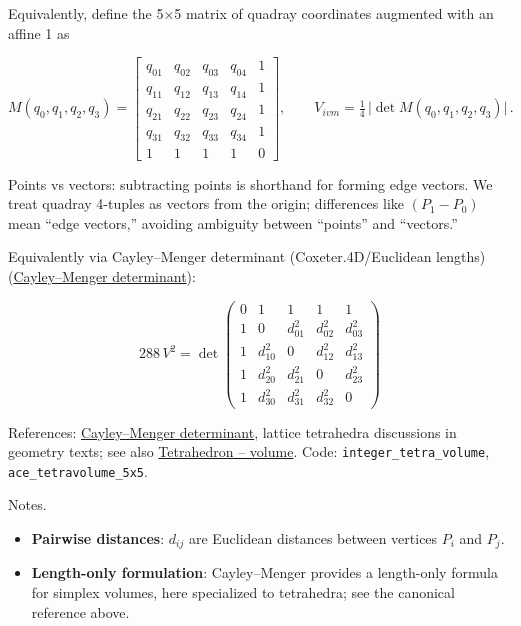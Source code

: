 \documentclass[
]{article}
\providecommand{\tightlist}{%
  \setlength{\itemsep}{0pt}\setlength{\parskip}{0pt}}
\begin{document}
Equivalently, define the 5×5 matrix of quadray coordinates augmented
with an affine 1 as

\begin{equation}\label{eq:ace5x5_expanded}
M(q_0,q_1,q_2,q_3) = \begin{bmatrix}
q_{01} & q_{02} & q_{03} & q_{04} & 1 \\
q_{11} & q_{12} & q_{13} & q_{14} & 1 \\
q_{21} & q_{22} & q_{23} & q_{24} & 1 \\
q_{31} & q_{32} & q_{33} & q_{34} & 1 \\
1 & 1 & 1 & 1 & 0
\end{bmatrix},\qquad V_{ivm} = \tfrac{1}{4}\,\big|\det M(q_0,q_1,q_2,q_3)\big|\,.
\end{equation}

Points vs vectors: subtracting points is shorthand for forming edge
vectors. We treat quadray 4-tuples as vectors from the origin;
differences like \((P_1-P_0)\) mean ``edge vectors,'' avoiding ambiguity
between ``points'' and ``vectors.''

Equivalently via Cayley--Menger determinant (Coxeter.4D/Euclidean
lengths)
(\href{https://en.wikipedia.org/wiki/Cayley\%E2\%80\%93Menger_determinant}{Cayley--Menger
determinant}):

\begin{equation}\label{eq:cayley_menger}
288\,V^2 = \det\begin{pmatrix}
  0 & 1 & 1 & 1 & 1 \\
  1 & 0 & d_{01}^2 & d_{02}^2 & d_{03}^2 \\
  1 & d_{10}^2 & 0 & d_{12}^2 & d_{13}^2 \\
  1 & d_{20}^2 & d_{21}^2 & 0 & d_{23}^2 \\
  1 & d_{30}^2 & d_{31}^2 & d_{32}^2 & 0
\end{pmatrix}
\end{equation}

References:
\href{https://en.wikipedia.org/wiki/Cayley\%E2\%80\%93Menger_determinant}{Cayley--Menger
determinant}, lattice tetrahedra discussions in geometry texts; see also
\href{https://en.wikipedia.org/wiki/Tetrahedron\#Volume}{Tetrahedron --
volume}. Code: \texttt{integer\_tetra\_volume},
\texttt{ace\_tetravolume\_5x5}.

Notes.

\begin{itemize}
\tightlist
\item
  \textbf{Pairwise distances}: \(d_{ij}\) are Euclidean distances
  between vertices \(P_i\) and \(P_j\).
\item
  \textbf{Length-only formulation}: Cayley--Menger provides a
  length-only formula for simplex volumes, here specialized to
  tetrahedra; see the canonical reference above.
\end{itemize}
\end{document}
